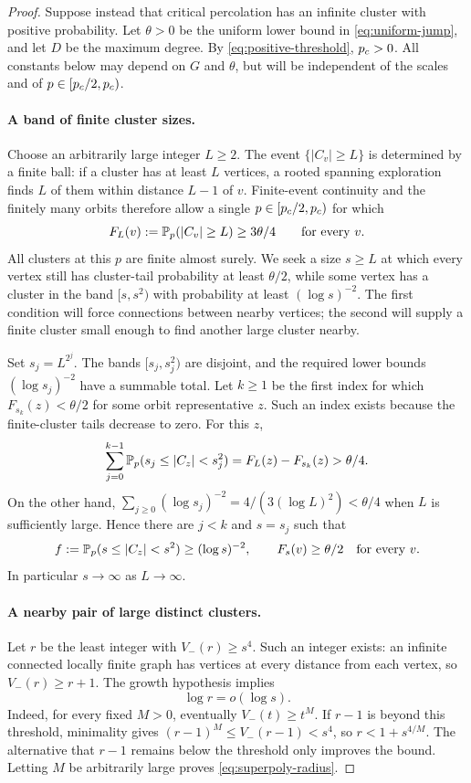 \begin{proof}
Suppose instead that critical percolation has an infinite cluster with
positive probability. Let $\theta>0$ be the uniform lower bound in
\eqref{eq:uniform-jump}, and let $D$ be the maximum degree.
By \eqref{eq:positive-threshold}, $p_c>0$.
All constants below may depend on $G$ and $\theta$, but will be
independent of the scales and of $p\in[p_c/2,p_c)$.

\paragraph{A band of finite cluster sizes.}
Choose an arbitrarily large integer $L\ge2$. The event
$\{|C_v|\ge L\}$ is determined by a finite ball: if a cluster has
at least $L$ vertices, a rooted spanning exploration finds $L$ of them
within distance $L-1$ of $v$. Finite-event continuity and the finitely
many orbits therefore allow a single $p\in[p_c/2,p_c)$ for which
\[
 F_L(v):=\mathbb P_p(|C_v|\ge L)\ge3\theta/4
 \qquad\text{for every }v.
\]
All clusters at this $p$ are finite almost surely. We seek a size
$s\ge L$ at which every vertex still has cluster-tail probability at
least $\theta/2$, while some vertex has a cluster in the band
$[s,s^2)$ with probability at least $(\log s)^{-2}$. The first condition
will force connections between nearby vertices; the second will supply
a finite cluster small enough to find another large cluster nearby.

Set $s_j=L^{2^j}$. The bands $[s_j,s_j^2)$ are disjoint, and the required
lower bounds $(\log s_j)^{-2}$ have a summable total. Let $k\ge1$ be
the first index for which
$F_{s_k}(z)<\theta/2$ for some orbit representative $z$.
Such an index exists because the finite-cluster tails decrease to zero.
For this $z$,
\[
 \sum_{j=0}^{k-1}\mathbb P_p(s_j\le |C_z|<s_j^2)
 =F_L(z)-F_{s_k}(z)>\theta/4.
\]
On the other hand,
$\sum_{j\ge0}(\log s_j)^{-2}=4/(3(\log L)^2)<\theta/4$
when $L$ is sufficiently large. Hence there are $j<k$ and $s=s_j$
such that
\begin{equation}\label{eq:superpoly-band}
 f:=\mathbb P_p(s\le |C_z|<s^2)\ge(\log s)^{-2},
 \qquad F_s(v)\ge\theta/2\quad\text{for every }v.
\end{equation}
In particular $s\to\infty$ as $L\to\infty$.

\paragraph{A nearby pair of large distinct clusters.}
Let $r$ be the least integer with $V_-(r)\ge s^4$.
Such an integer exists: an infinite connected locally finite graph has
vertices at every distance from each vertex, so $V_-(r)\ge r+1$.
The growth hypothesis implies
\begin{equation}\label{eq:superpoly-radius}
 \log r=o(\log s).
\end{equation}
Indeed, for every fixed $M>0$, eventually $V_-(t)\ge t^M$.
If $r-1$ is beyond this threshold, minimality gives
$(r-1)^M\le V_-(r-1)<s^4$, so $r<1+s^{4/M}$.
The alternative that $r-1$ remains below the threshold only improves
the bound. Letting $M$ be arbitrarily large proves
\eqref{eq:superpoly-radius}.


\end{proof}
